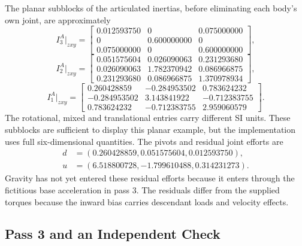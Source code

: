 The planar subblocks of the articulated inertias, before eliminating each body's own joint, are approximately
\begin{equation}
 I_3^A\big|_{zxy}=
 \begin{bmatrix}0.012593750&0&0.075000000\\0&0.600000000&0\\0.075000000&0&0.600000000\end{bmatrix},
\end{equation}
\begin{equation}
 I_2^A\big|_{zxy}=
 \begin{bmatrix}0.051575604&0.026090063&0.231293680\\
 0.026090063&1.782370942&0.086966875\\
 0.231293680&0.086966875&1.370978934\end{bmatrix},
\end{equation}
\begin{equation}
 I_1^A\big|_{zxy}=
 \begin{bmatrix}0.260428859&-0.284953502&0.783624232\\
 -0.284953502&3.143841922&-0.712383755\\
 0.783624232&-0.712383755&2.959060579\end{bmatrix}.
\end{equation}
The rotational, mixed and translational entries carry different SI units. These subblocks are sufficient to display this planar example, but the implementation uses full six-dimensional quantities. The pivots and residual joint efforts are
\begin{equation}
 \begin{aligned}
 d&=(0.260428859,0.051575604,0.012593750),\\
 u&=(6.518800728,-1.799610488,0.314231273).
 \end{aligned}
\end{equation}
Gravity has not yet entered these residual efforts because it enters through the fictitious base acceleration in pass 3. The residuals differ from the supplied torques because the inward bias carries descendant loads and velocity effects.

\subsection{Pass 3 and an Independent Check}
\label{subsec:pass3_example}

